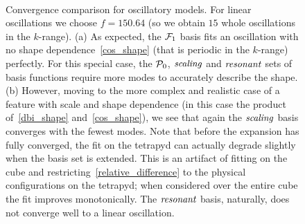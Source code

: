 \begin{figure}[!pth]
\centering     %
\\
\caption{
    Convergence comparison for oscillatory models.
    For linear oscillations we choose $f=150.64$ (so we obtain $15$ whole oscillations in the $k$-range).
    (a) As expected, the $\mathcal{F}_1$ basis fits an oscillation with
    no shape dependence~\eqref{cos_shape} (that is periodic in the $k$-range) perfectly.
    For this special case, the $\mathcal{P}_0$, $\textit{scaling}$ and $\textit{resonant}$ sets of basis functions require more modes
    to accurately describe the shape. (b) However, moving to the more complex and realistic case of a
    feature with scale and shape dependence (in this case the product of~\eqref{dbi_shape}
    and~\eqref{cos_shape}), we see that again the $\textit{scaling}$ basis converges with the fewest modes.
    Note that before the expansion has fully converged, the fit on the tetrapyd
    can actually degrade slightly when the basis set is extended. This is an artifact
    of fitting on the cube and restricting~\eqref{relative_difference}
    to the physical configurations on the tetrapyd; when considered over the
    entire cube the fit improves monotonically.
    The $\textit{resonant}$ basis, naturally, does not converge well to a linear oscillation.
}\label{fig:recon_osc_dbiosc}
\end{figure}
